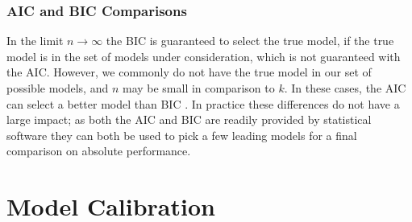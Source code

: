\subsubsection{AIC and BIC Comparisons}
\label{ml_general:eval:BIC_comp_AIC}

In the limit $n \to \infty$ the BIC is guaranteed to select the true model,
if the true model is in the set of models under consideration,
which is not guaranteed with the AIC.
However, we commonly do not have the true model in our set of possible models,
and $n$ may be small in comparison to $k$.
In these cases, the AIC can select a better model than BIC
\cite{1311138,doi:10.1177/0049124104268644,Vrieze_2012,8498082}.
In practice these differences do not have a large impact;
as both the AIC and BIC are readily provided by statistical software
they can both be used to pick a few leading models
for a final comparison on absolute performance.

\section{Model Calibration}
\label{ml_general:calibration}


